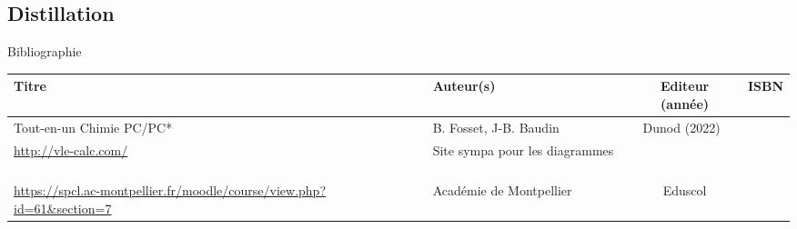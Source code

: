 \begin{headerBlock}
\chapter{Distillation}
    \label{LC_Distillation}
\end{headerBlock}




\begin{reportBlock}{Bibliographie}

\begin{center}
\begin{tabularx}{\textwidth}{| X | X | c | c |}\hline
Titre & Auteur(s) & Editeur (année) & ISBN \\ \hline
Tout-en-un Chimie PC/PC* ~ & B. Fosset, J-B. Baudin  ~ & Dunod (2022)~ & ~ \\
\hline 
\url{http://vle-calc.com/} & Site sympa pour les diagrammes ~ &  ~ & ~ \\
\hline
\url{https://spcl.ac-montpellier.fr/moodle/course/view.php?id=61&section=7} & Académie de Montpellier & Eduscol & ~ \\ \hline
\end{tabularx}
\end{center}

\end{reportBlock}

